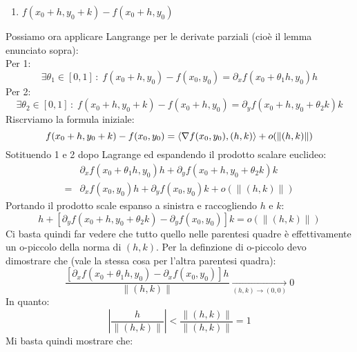 {\begin{enumerate}
		\item $f(x_0 + h, y_0 + k) - f(x_0 + h, y_0)$
	\end{enumerate}
	Possiamo ora applicare Langrange per le derivate parziali (cioè il 
	lemma enunciato sopra):\\
	Per 1:
	\begin{equation*}
		\exists \theta_1 \in [0, 1] \, : \; f(x_0 + h, y_0) - 
		f(x_0, y_0) = \partial_x f(x_0 + \theta_1 h, y_0)h
	\end{equation*}
	Per 2:
	\begin{equation*}
		\exists \theta_2 \in [0, 1] \, : \; f(x_0 + h, y_0 + k) - 
		f(x_0 + h, y_0) = \partial_y f(x_0 + h, y_0 + \theta_2 k)k
	\end{equation*}
	Riscrviamo la formula iniziale:
	\begin{equation*}
		f(x_0 + h, y_0 + k) - f(x_0, y_0) = \langle \nabla f(x_0, y_0), 
		(h, k) \rangle + o(\lVert (h, k) \rVert)\\
	\end{equation*}
	Sotituendo 1 e 2 dopo Lagrange ed espandendo il prodotto scalare euclideo:
	\begin{align*}
		&\partial_x f(x_0 + \theta_1 h, y_0) h + \partial_y f(x_0 + h, y_0 + 
		\theta_2 k) k \\[2pt]
		=& \partial_x f(x_0, y_0) h + \partial_y f(x_0, y_0) k + 
		o(\lVert (h, k) \rVert)
	\end{align*}
    Portando il prodotto scale espanso a sinistra e raccogliendo $h$ e $k$:
	\begin{equation*}
		[\partial_x f(x_0 + \theta_1 h, y_0) - \partial_x f(x_0, y_0) ]h 
		+ [\partial_y f(x_0 + h, y_0 + \theta_2 k) - \partial_y f(x_0, 
		y_0)]k = o(\lVert (h, k) \rVert)
	\end{equation*}
	Ci basta quindi far vedere che tutto quello nelle parentesi quadre è 
	effettivamente un o-piccolo della norma di $(h, k)$. Per la definzione 
	di o-piccolo devo dimostrare che (vale la stessa cosa per l'altra 
	parentesi quadra):
	\begin{equation*}
		\dfrac{[\partial_x f(x_0 + \theta_1 h, y_0) - \partial_x 
		f(x_0, y_0) ]h}{\lVert (h, k) \rVert} \xrightarrow[(h, k) \to 
		(0, 0)] {} 0
	\end{equation*}
	In quanto:
	\begin{equation*}
		\left | \dfrac{h}{\lVert (h, k) \rVert} \right | < \dfrac{\lVert 
		(h, k) \rVert}{\lVert (h, k) \rVert} = 1
	\end{equation*}
	Mi basta quindi mostrare che:
	\begin{equation*}

\end{equation*}}
